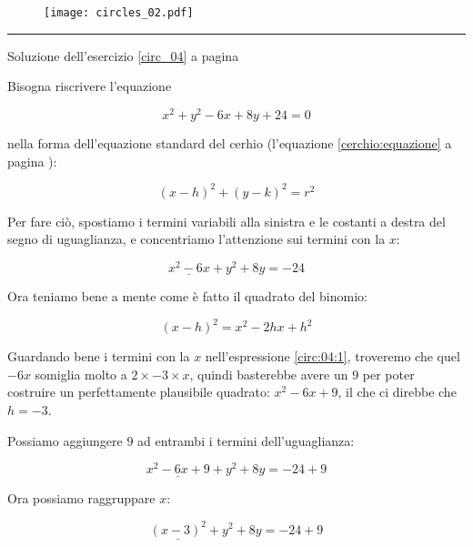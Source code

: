 \begin{figure}[H]
\centering
\texttt{[image: circles\_02.pdf]}
\end{figure}




\vspace{1cm}
\hrule
\vspace{1cm}


Soluzione dell'esercizio \ref{circ_04} a pagina \pageref{circ_04}\label{circs_04}

\vspace{1cm}

Bisogna riscrivere l'equazione 

\begin{equation*}
x^2+y^2-6x+8y+24=0 
\end{equation*}

nella forma dell'equazione standard del cerhio (l'equazione \ref{cerchio:equazione} a pagina \pageref{cerchio:equazione}):


\begin{equation*}
(x-h)^2+(y-k)^2=r^2
\end{equation*}

Per fare ciò, spostiamo i termini variabili alla sinistra e le costanti a destra del segno di uguaglianza, e concentriamo l'attenzione sui termini con la $x$:

\begin{equation} \label{circ:04:1}
\underline{x^2-6x}+y^2+8y=-24
\end{equation}

Ora teniamo bene a mente come è fatto il quadrato del binomio:

\begin{equation*}
(x-h)^2 = x^2-2hx +h^2
\end{equation*}

Guardando bene i termini con la $x$ nell'espressione \ref{circ:04:1}, troveremo che quel $-6x$ somiglia molto a $2\times -3\times x$, quindi basterebbe avere un $9$ per poter costruire un perfettamente plausibile quadrato: $x^2-6x+9$, il che ci direbbe che $h=-3$.

Possiamo aggiungere $9$ ad entrambi i termini dell'uguaglianza:


\begin{equation*}
\underline{x^2
-6x
+9
}
+y^2
+8y=-24 + 9 
\end{equation*}

Ora possiamo raggruppare $x$:


\begin{equation*}
\underline{(x-3)^2 }
+y^2
+8y=-24 + 9 
\end{equation*}

